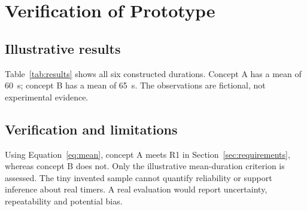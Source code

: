 \chapter{Verification of Prototype}
\label{chap:verification_of_prototype}

\section{Illustrative results}
\label{sec:results}
Table~\ref{tab:results} shows all six constructed durations.
Concept A has a mean of \qty{60}{\second}; concept B has a mean of
\qty{65}{\second}. The observations are fictional, not experimental evidence.


\section{Verification and limitations}
Using Equation~\ref{eq:mean}, concept A meets R1 in
Section~\ref{sec:requirements}, whereas concept B does not.
Only the illustrative mean-duration criterion is assessed. The tiny invented
sample cannot quantify reliability or support inference about real timers.
A real evaluation would report uncertainty, repeatability and potential bias.
